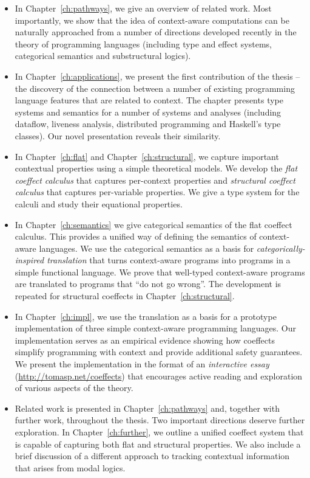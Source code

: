 \begin{itemize}
\item In Chapter~\ref{ch:pathways}, we give an overview of related work. Most importantly, we show
  that the idea of context-aware computations can be naturally approached from a number of
  directions developed recently in the theory of programming languages (including type and effect
  systems, categorical semantics and substructural logics).

\item In Chapter~\ref{ch:applications}, we present the first contribution of the thesis -- the discovery
  of the connection between a number of existing programming language features that are related
  to context. The chapter presents type systems and semantics for a number of systems and analyses
  (including dataflow, liveness analysis, distributed programming and Haskell's type classes).
  Our novel presentation reveals their similarity.

\item In Chapter~\ref{ch:flat} and Chapter~\ref{ch:structural}, we capture important contextual
  properties using a simple theoretical models. We develop the \emph{flat coeffect calculus} that
  captures per-context properties and \emph{structural coeffect calculus} that captures
  per-variable properties. We give a type system for the calculi and study their equational
  properties.

\item In Chapter~\ref{ch:semantics} we give categorical semantics of the flat coeffect calculus.
  This provides a unified way of defining the semantics of context-aware languages. We use the
  categorical semantics as a basis for \emph{categorically-inspired translation} that turns
  context-aware programs into programs in a simple functional language. We prove that well-typed
  context-aware programs are translated to programs that ``do not go wrong''. The development
  is repeated for structural coeffects in Chapter~\ref{ch:structural}.

\item In Chapter~\ref{ch:impl}, we use the translation as a basis for a prototype
  implementation of three simple context-aware programming languages. Our implementation serves as
  an empirical evidence showing how coeffects simplify programming with context and provide
  additional safety guarantees. We present the implementation in the format of an \emph{interactive
  essay} (\url{http://tomasp.net/coeffects}) that encourages active reading and exploration of
  various aspects of the theory.

\item Related work is presented in Chapter~\ref{ch:pathways} and, together with further work,
  throughout the thesis. Two important directions deserve further exploration. In Chapter~\ref{ch:further},
  we outline a unified coeffect system that is capable of capturing both flat and structural
  properties. We also include a brief discussion of a different approach to tracking contextual
  information that arises from modal logics.
\end{itemize}

